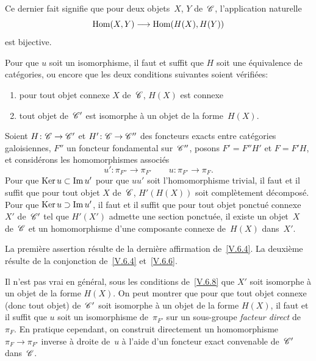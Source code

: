 Ce dernier fait signifie que pour deux objets~$X$, $Y$ de~$\cal{C}$,
l'application naturelle
$$
\Hom(X,Y) \to \Hom(H(X),H(Y))
$$
est bijective.

\begin{corollaire}
\label{V.6.10}
Pour
que $u$ soit un isomorphisme, il faut et suffit que $H$ soit une
\'equivalence de cat\'egories, ou encore que les deux conditions
suivantes soient v\'erifi\'ees:
\begin{enumerate}
\item[a)] pour tout objet connexe $X$ de~$\cal{C}$, $H(X)$ est connexe
\item[b)] tout objet de~$\cal{C}'$ est isomorphe \`a un objet de la
forme~$H(X)$.
\end{enumerate}
\end{corollaire}

\begin{proposition}
\label{V.6.11}
Soient $H\colon \cal{C}\to \cal{C}'$ et $H'\colon\cal{C}\to \cal{C}''$
des foncteurs exacts entre cat\'egories galoisiennes, $F''$ un
foncteur fondamental sur~$\cal{C}''$, posons $F'=F''H'$ et $F=F'H$, et
consid\'erons les homomorphismes associ\'es
$$
u'\colon\pi_{F''}\to \pi_{F'}\qquad u\colon\pi_{F'}\to \pi_F.
$$
Pour que $\operatorname{Ker} u\subset \operatorname{Im} u'$ \ie pour que $uu'$ soit
l'homomorphisme trivial, il faut et il suffit que pour tout objet $X$
de~$\cal{C}$, $H'(H(X))$ soit compl\`etement d\'ecompos\'e. Pour
que $\operatorname{Ker} u \supset \operatorname{Im} u' $, il faut et il suffit que pour tout objet
ponctu\'e connexe $X'$ de~$\cal{C}'$ tel que $H'(X')$ admette une
section ponctu\'ee, il existe un objet~$X$ de~$\cal{C}$ et un
homomorphisme d'une composante connexe de~$H(X)$ dans~$X'$.
\end{proposition}

La premi\`ere assertion r\'esulte de la derni\`ere affirmation
de~\ref{V.6.4}. La deuxi\`eme r\'esulte de la conjonction
de~\ref{V.6.4} et~\ref{V.6.6}.

\begin{remarque}
\label{V.6.12}
Il n'est pas vrai en g\'en\'eral, sous les conditions
de~\ref{V.6.8} que $X'$ soit isomorphe \`a un objet de la forme
$H(X)$. On peut montrer que pour que tout objet connexe (donc tout
objet) de~$\cal{C}'$ soit isomorphe \`a un objet de la forme $H(X)$,
il faut et il suffit que $u$ soit un isomorphisme de~$\pi_{F'}$ sur un
sous-groupe \emph{facteur direct} de~$\pi_F$. En pratique cependant,
on construit directement un homomorphisme $\pi_F\to\pi_{F'}$ inverse
\`a droite de~$u$ \`a l'aide d'un foncteur exact convenable
de~$\cal{C'}$ dans~$\cal{C}$.
\end{remarque}

